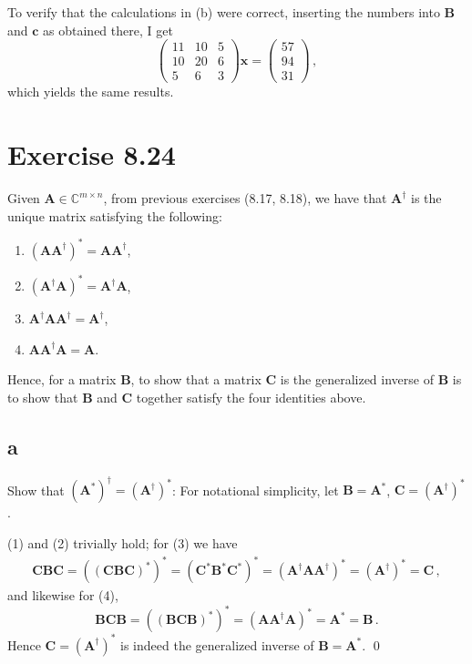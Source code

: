\documentclass[11pt]{amsart}
\theoremstyle{definition}
\newcommand{\A}{\mathbb{A}}
\newcommand{\B}{\mathbb{B}}
\newcommand{\C}{\mathbb{C}}
\numberwithin{equation}{section}
\begin{document}
To verify that the calculations in (b) were correct, inserting the numbers into $\mathbf{B}$ and $\mathbf{c}$ as obtained there, I get
\begin{equation}
\left(
\begin{matrix}
11&10&5\\
10&20&6\\
5&6&3
\end{matrix}
\right)
\mathbf{x}
=
\left(
\begin{matrix}
57\\94\\31
\end{matrix}
\right)\,,
\end{equation}
which yields the same results.

\section*{Exercise 8.24}
\renewcommand{\A}{\mathbf{A}}
\newcommand{\Ast}{\mathbf{A^*}}
\newcommand{\Gaist}{(\mathbf{A}^\dagger)^*}
\newcommand{\Gai}{\mathbf{A^\dagger}}

\renewcommand{\B}{\mathbf{B}}
\newcommand{\Bst}{\mathbf{B}^*}
\newcommand{\Binv}{\mathbf{C}}
\newcommand{\Bstinv}{(\mathbf{C^*}}
Given $\A \in \C^{m\times n}$, from previous exercises (8.17, 8.18), we have that $\Gai$ is the unique matrix satisfying the following:
\begin{enumerate}
\item $(\A\Gai)^* = \A\Gai$,
\item $(\Gai \A)^* = \Gai \A$,
\item $\Gai \A \Gai = \Gai$,
\item $\A \Gai \A = \A$.
\end{enumerate}
Hence, for a matrix $\B$, to show that a matrix $\Binv$ is the generalized inverse of $\B$ is to show that $\B$ and $\Binv$ together satisfy the four identities above.

\subsection*{a} Show that $(\mathbf{A}^*)^\dagger = (\Gai)^*$:
For notational simplicity, let $\mathbf{B} = \A^*$, $\mathbf{C} = \Gaist$.

(1) and (2) trivially hold; for (3) we have
\begin{align*}
\Binv \B \Binv
=((\Binv \B \Binv)^*)^*
= (\Binv^* \B^* \Binv^*)^*
=(\Gai \A \Gai)^* = \Gaist = \Binv\,,
\end{align*}
and likewise for (4),
\begin{equation}
\B \Binv \B
=((\B \Binv \B)^*)^*
=(\A \Gai \A)^* = \A^* = \B\,.
\end{equation}
Hence $\Binv = \Gaist$ is indeed the generalized inverse of $\B = \Ast$.
\qed
\end{document}
